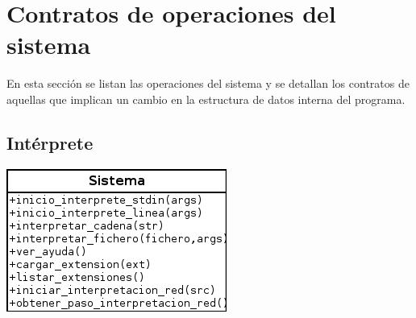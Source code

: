 \section{Contratos de operaciones del sistema}
En esta sección se listan las operaciones del sistema y se detallan los contratos de aquellas
que implican un cambio en la estructura de datos interna del programa. 

\subsection{Intérprete}
\begin{center}
\includegraphics[scale=0.7]{operaciones_sistema.png} \\
\end{center}
